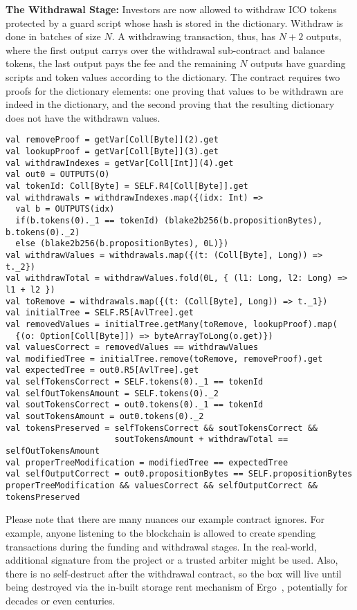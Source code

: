 \documentclass[runningheads]{llncs}
\begin{document}
\textbf{The Withdrawal Stage:}
Investors are now allowed to withdraw ICO tokens protected by a guard script whose hash is stored in the dictionary. Withdraw is done in batches of size $N$. A withdrawing transaction, thus, has $N + 2$ outputs, where the first output carrys over the withdrawal sub-contract and balance tokens, the last output pays the fee and the remaining $N$ outputs have guarding scripts and token values according to the dictionary. The contract requires two proofs for the dictionary elements: one proving that values to be withdrawn are indeed in the dictionary, and the second proving that the resulting dictionary does not have the withdrawn values. 
\small{
\begin{verbatim}
val removeProof = getVar[Coll[Byte]](2).get
val lookupProof = getVar[Coll[Byte]](3).get
val withdrawIndexes = getVar[Coll[Int]](4).get
val out0 = OUTPUTS(0)
val tokenId: Coll[Byte] = SELF.R4[Coll[Byte]].get
val withdrawals = withdrawIndexes.map({(idx: Int) =>
  val b = OUTPUTS(idx)
  if(b.tokens(0)._1 == tokenId) (blake2b256(b.propositionBytes), b.tokens(0)._2)
  else (blake2b256(b.propositionBytes), 0L)})
val withdrawValues = withdrawals.map({(t: (Coll[Byte], Long)) => t._2})
val withdrawTotal = withdrawValues.fold(0L, { (l1: Long, l2: Long) => l1 + l2 })
val toRemove = withdrawals.map({(t: (Coll[Byte], Long)) => t._1})
val initialTree = SELF.R5[AvlTree].get
val removedValues = initialTree.getMany(toRemove, lookupProof).map(
  {(o: Option[Coll[Byte]]) => byteArrayToLong(o.get)})
val valuesCorrect = removedValues == withdrawValues
val modifiedTree = initialTree.remove(toRemove, removeProof).get
val expectedTree = out0.R5[AvlTree].get
val selfTokensCorrect = SELF.tokens(0)._1 == tokenId
val selfOutTokensAmount = SELF.tokens(0)._2
val soutTokensCorrect = out0.tokens(0)._1 == tokenId
val soutTokensAmount = out0.tokens(0)._2
val tokensPreserved = selfTokensCorrect && soutTokensCorrect && 
                      soutTokensAmount + withdrawTotal == selfOutTokensAmount
val properTreeModification = modifiedTree == expectedTree
val selfOutputCorrect = out0.propositionBytes == SELF.propositionBytes
properTreeModification && valuesCorrect && selfOutputCorrect && tokensPreserved
\end{verbatim}
}

Please note that there are many nuances our example contract ignores. For example, anyone listening to the blockchain is allowed to create spending transactions during the funding and withdrawal stages. In the real-world, additional signature from the project or a trusted arbiter might be used. Also, there is no self-destruct after the withdrawal contract, so the box will live until being destroyed via the in-built storage rent mechanism of Ergo~\cite{tutorial}, potentially for decades or even centuries. 
\end{document}
